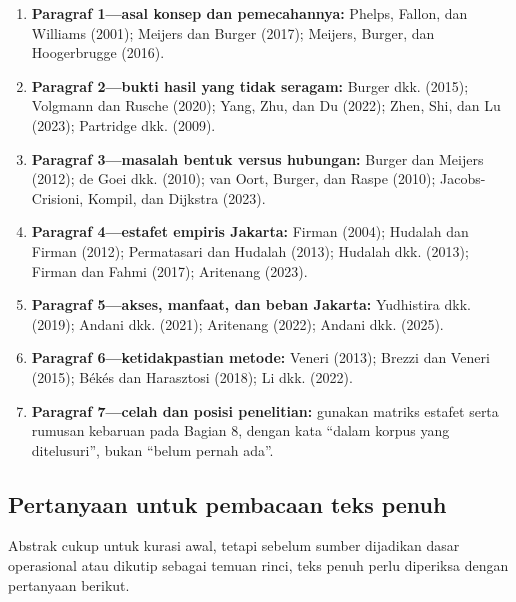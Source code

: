 \documentclass[
  indonesian,
  11pt,
  a4paper,
  oneside,
  openany]{report}
\providecommand{\tightlist}{%
  \setlength{\itemsep}{0pt}\setlength{\parskip}{0pt}}
\begin{document}
\begin{enumerate}
\def\labelenumi{\arabic{enumi}.}
\tightlist
\item
  \textbf{Paragraf 1---asal konsep dan pemecahannya:} Phelps, Fallon,
  dan Williams (2001); Meijers dan Burger (2017); Meijers, Burger, dan
  Hoogerbrugge (2016).
\item
  \textbf{Paragraf 2---bukti hasil yang tidak seragam:} Burger dkk.
  (2015); Volgmann dan Rusche (2020); Yang, Zhu, dan Du (2022); Zhen,
  Shi, dan Lu (2023); Partridge dkk. (2009).
\item
  \textbf{Paragraf 3---masalah bentuk versus hubungan:} Burger dan
  Meijers (2012); de Goei dkk. (2010); van Oort, Burger, dan Raspe
  (2010); Jacobs-Crisioni, Kompil, dan Dijkstra (2023).
\item
  \textbf{Paragraf 4---estafet empiris Jakarta:} Firman (2004); Hudalah
  dan Firman (2012); Permatasari dan Hudalah (2013); Hudalah dkk.
  (2013); Firman dan Fahmi (2017); Aritenang (2023).
\item
  \textbf{Paragraf 5---akses, manfaat, dan beban Jakarta:} Yudhistira
  dkk. (2019); Andani dkk. (2021); Aritenang (2022); Andani dkk. (2025).
\item
  \textbf{Paragraf 6---ketidakpastian metode:} Veneri (2013); Brezzi dan
  Veneri (2015); Békés dan Harasztosi (2018); Li dkk. (2022).
\item
  \textbf{Paragraf 7---celah dan posisi penelitian:} gunakan matriks
  estafet serta rumusan kebaruan pada Bagian 8, dengan kata ``dalam
  korpus yang ditelusuri'', bukan ``belum pernah ada''.
\end{enumerate}

\subsection{Pertanyaan untuk pembacaan teks
penuh}\label{pertanyaan-untuk-pembacaan-teks-penuh}

Abstrak cukup untuk kurasi awal, tetapi sebelum sumber dijadikan dasar
operasional atau dikutip sebagai temuan rinci, teks penuh perlu
diperiksa dengan pertanyaan berikut.
\end{document}
